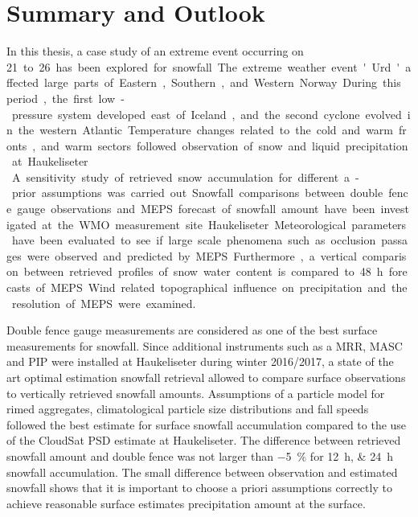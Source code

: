 
\chapter{Summary and Outlook}
In this thesis, a case study of an extreme event occurring on \SI{21} to \SI{26}{\dec} has been explored for snowfall. The extreme weather event 'Urd' affected large parts of Eastern, Southern, and Western Norway. During this period, the first low-pressure system developed east of Iceland, and the second cyclone evolved in the western Atlantic. Temperature changes related to the cold and warm fronts, and warm sectors followed observation of snow and liquid precipitation at Haukeliseter.
\\
A sensitivity study of retrieved snow accumulation for different a-prior assumptions was carried out. 
Snowfall comparisons between double fence gauge observations and MEPS forecast of snowfall amount have been investigated at the WMO measurement site Haukeliseter. Meteorological parameters have been evaluated to see if large scale phenomena such as occlusion passages were observed and predicted by MEPS.
Furthermore, a vertical comparison between retrieved profiles of snow water content is compared to \SI{48}{\hour} forecasts of MEPS. Wind related topographical influence on precipitation and the resolution of MEPS were examined.
\par\medskip
\noindent
Double fence gauge measurements are considered as one of the best surface measurements for snowfall. Since additional instruments such as a MRR, MASC and PIP were installed at Haukeliseter during winter 2016/2017, a state of the art optimal estimation snowfall retrieval allowed to compare surface observations to vertically retrieved snowfall amounts. 
Assumptions of a particle model for rimed aggregates, climatological particle size distributions and fall speeds followed the best estimate for surface snowfall accumulation compared to the use of the CloudSat PSD estimate at Haukeliseter. The difference between retrieved snowfall amount and double fence was not larger than \SI{-5}{\percent} for \SIlist{12;24}{\hour} snowfall accumulation. The small difference between observation and estimated snowfall shows that it is important to choose a priori assumptions correctly to achieve reasonable surface estimates precipitation amount at the surface.
